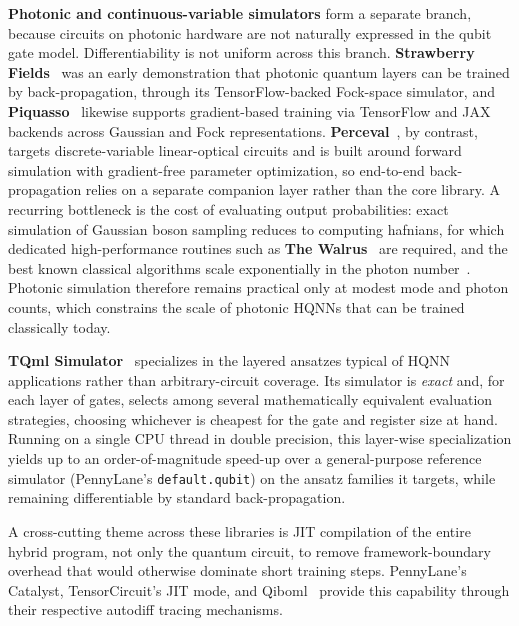 \documentclass[aps,10pt,groupedaddress,prx,superscriptaddress,twocolumn,balancelastpage, tightenlines]{revtex4-2}
\theoremstyle{plain}  %
\begin{document}
\textbf{Photonic and continuous-variable simulators} form a separate branch, because circuits on photonic hardware are not naturally expressed in the qubit gate model. Differentiability is not uniform across this branch. \textbf{Strawberry Fields}~\cite{killoran_continuous-variable_2019} was an early demonstration that photonic quantum layers can be trained by back-propagation, through its TensorFlow-backed Fock-space simulator, and \textbf{Piquasso}~\cite{kolarovszki_piquasso_2025} likewise supports gradient-based training via TensorFlow and JAX backends across Gaussian and Fock representations. \textbf{Perceval}~\cite{heurtel_perceval_2023}, by contrast, targets discrete-variable linear-optical circuits and is built around forward simulation with gradient-free parameter optimization, so end-to-end back-propagation relies on a separate companion layer rather than the core library. A recurring bottleneck is the cost of evaluating output probabilities: exact simulation of Gaussian boson sampling reduces to computing hafnians, for which dedicated high-performance routines such as \textbf{The Walrus}~\cite{gupt_walrus_2019} are required, and the best known classical algorithms scale exponentially in the photon number~\cite{quesada_exact_2020, clifford_classical_2018}. Photonic simulation therefore remains practical only at modest mode and photon counts, which constrains the scale of photonic \glspl{HQNN} that can be trained classically today.

\textbf{TQml Simulator}~\cite{kuzmin_tqml_2025} specializes in the layered ansatzes typical of \gls{HQNN} applications rather than arbitrary-circuit coverage. Its simulator is \emph{exact} and, for each layer of gates, selects among several mathematically equivalent evaluation strategies, choosing whichever is cheapest for the gate and register size at hand. Running on a single CPU thread in double precision, this layer-wise specialization yields up to an order-of-magnitude speed-up over a general-purpose reference simulator (PennyLane's \texttt{default.qubit}) on the ansatz families it targets, while remaining differentiable by standard back-propagation.

A cross-cutting theme across these libraries is \gls{JIT} compilation of the entire hybrid program, not only the quantum circuit, to remove framework-boundary overhead that would otherwise dominate short training steps. PennyLane's Catalyst, TensorCircuit's JIT mode, and Qiboml~\cite{robbiati_qiboml_2025} provide this capability through their respective autodiff tracing mechanisms.
\end{document}

